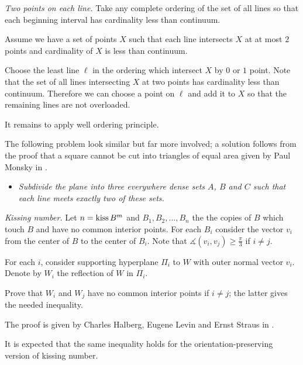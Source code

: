 \textit{Two points on each line.}
Take any complete ordering of the set of all lines 
so that each beginning interval has cardinality less than continuum.

Assume we have a set of points $X$ such that each line intersects $X$ at at most $2$ points and cardinality of $X$ is less than continuum.

Choose the least line $\ell$ in the ordering which intersect $X$ 
by $0$ or $1$ point.
Note that the set of all lines intersecting $X$ at two points has cardinality less than continuum.
Therefore we can choose a point on $\ell$ and add it to $X$ so that the remaining lines are not overloaded.

It remains to apply well ordering principle.

The following problem look similar but far more involved;
a solution follows from the proof that a square cannot be cut into triangles of equal area given by Paul Monsky in \cite{monsky}.

\begin{itemize}
\item {\it Subdivide the plane into three everywhere dense sets $A$, $B$ and $C$ such that each line meets exactly two of these sets.}
\end{itemize}









\textit{Kissing number.}
Let $n=\mathop{\rm kiss} B^m$
and $B_1,B_2,\dots, B_n$ the the copies of $B$ 
which touch $B$ and have no common interior points.
For each $B_i$ consider the vector $v_i$ from the center of $B$ to the center of $B_i$.
Note that $\measuredangle(v_i,v_j)\ge \tfrac\pi3$ if $i\ne j$.

For each $i$,
consider supporting hyperplane $\Pi_i$
to $W$
with outer normal vector $v_i$.
Denote by $W_i$ the reflection of $W$ in $\Pi_i$.

Prove that $W_i$ and $W_j$ have no common interior points if $i\ne j$;
the latter gives the needed inequality.

The proof is given by 
Charles Halberg, 
Eugene Levin 
and Ernst Straus 
in \cite{halberg-levin-straus}.

It is expected that the same inequality holds for the orientation-preserving version of kissing number.




